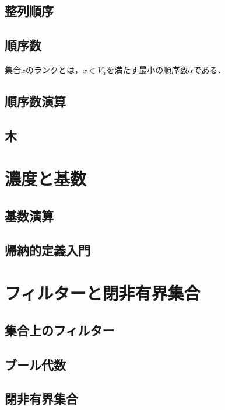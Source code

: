 \documentclass[uplatex, 12pt, dvipdfmx]{jsreport}
\begin{document}
\subsection{整列順序}

\subsection{順序数}

\begin{definition}
    集合$x$のランクとは，$x\in V_\alpha$を満たす最小の順序数$\alpha$である．
\end{definition}

\subsection{順序数演算}

\subsection{木}

\section{濃度と基数}

\subsection{基数演算}

\subsection{帰納的定義入門}

\section{フィルターと閉非有界集合}

\subsection{集合上のフィルター}

\subsection{ブール代数}

\subsection{閉非有界集合}
\end{document}
